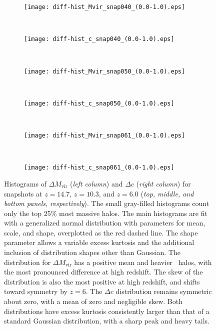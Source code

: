 \begin{figure*}[t]
	\centering
	\begin{subfigure}{}
		\texttt{[image: diff-hist\_Mvir\_snap040\_(0.0-1.0).eps]}
	\end{subfigure}
	~
	\begin{subfigure}{}
		\texttt{[image: diff-hist\_c\_snap040\_(0.0-1.0).eps]}
	\end{subfigure}
	\\
	\begin{subfigure}{}
		\texttt{[image: diff-hist\_Mvir\_snap050\_(0.0-1.0).eps]}
	\end{subfigure}
	~
	\begin{subfigure}{}
		\texttt{[image: diff-hist\_c\_snap050\_(0.0-1.0).eps]}
	\end{subfigure}
	\\
	\begin{subfigure}{}
		\texttt{[image: diff-hist\_Mvir\_snap061\_(0.0-1.0).eps]}
	\end{subfigure}
	~
	\begin{subfigure}{}
		\texttt{[image: diff-hist\_c\_snap061\_(0.0-1.0).eps]}
	\end{subfigure}
	\caption[Histograms of $\Delta M_{\mathrm{vir}}$ and $\Delta c$]{\footnotesize Histograms of $\Delta M_{\mathrm{vir}}$ (\textit{left column}) and $\Delta c$ (\textit{right column}) for snapshots at $z = 14.7$, $z = 10.3$, and $z = 6.0$ (\textit{top, middle, and bottom panels, respectively}).  The small gray-filled histograms count only the top 25\% most massive halos.  The main histograms are fit with a generalized normal distribution with parameters for mean, scale, and shape, overplotted as the red dashed line.  The shape parameter allows a variable excess kurtosis and the additional inclusion of distribution shapes other than Gaussian.  The distribution for $\Delta M_{\mathrm{vir}}$ has a positive mean and heavier \lpt\ halos, with the most pronounced difference at high redshift.  The skew of the distribution is also the most positive at high redshift, and shifts toward symmetry by $z = 6$.  The $\Delta c$ distribution remains symmetric about zero, with a mean of zero and negligible skew.  Both distributions have excess kurtosis consistently larger than that of a standard Gaussian distribution, with a sharp peak and heavy tails.}
	\label{fig:diff-hist_Mvir}
\end{figure*}

